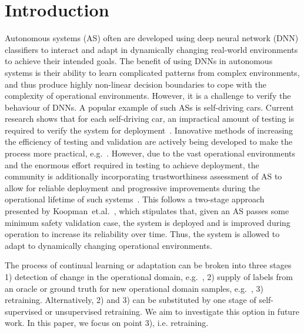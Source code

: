 \section{Introduction}
Autonomous systems (AS) often are developed using deep neural network (DNN) classifiers to interact and adapt in dynamically changing real-world environments to achieve their intended goals. 
%
The benefit of using DNNs in autonomous systems is their ability to learn complicated patterns 
from complex environments, and thus produce highly non-linear decision boundaries to cope with the complexity of operational environments.
%
However, it is a challenge to verify the behaviour of DNNs.   
%
A popular example of such ASs is self-driving cars. Current research shows that for each self-driving car, an impractical amount of testing is required to verify the system for deployment~\cite{RR-1478-RC}. Innovative methods of increasing the efficiency of testing and validation are actively being developed to make the process more practical, e.g.~\cite{chance2020agency,eder2021complete}. 
%
However, due to the vast operational environments and the enormous effort required in testing to achieve deployment, the community is additionally incorporating trustworthiness assessment of AS to allow for reliable deployment and progressive improvements during the operational lifetime of such systems~\cite{chance2023assessing}. 
%
This follows a two-stage approach presented by Koopman~et.al.~\cite{Koopman2020}, which stipulates that, given an AS passes some minimum safety validation case, the system is deployed and is improved during operation to increase its reliability over time. 
%
Thus, the system is allowed to adapt to dynamically changing operational environments.

The process of continual learning or adaptation can be broken into three stages 1) detection of change in the operational domain, e.g.~\cite{Hond2020,Schaffer2017, Mandelbaum2017, Xing2019}, 2) supply of labels from an oracle or ground truth for new operational domain samples, e.g.~\cite{Barr2015,Zhang2020}, 3) retraining. 
%
Alternatively, 2) and 3) can be substituted by one stage of self-supervised or unsupervised retraining. We aim to investigate this option in future work.
%
In this paper, we focus on point 3), i.e. retraining.


